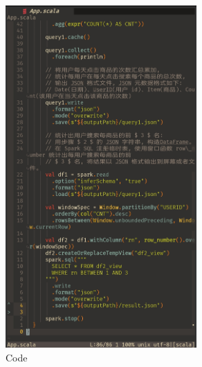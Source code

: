\documentclass{article}
\begin{document}
\begin{figure}[H]
  \begin{center}
    \includegraphics[width=0.65\textwidth]{./figures/2.jpg}
  \end{center}
  \caption{Code}
\end{figure}
\end{document}
